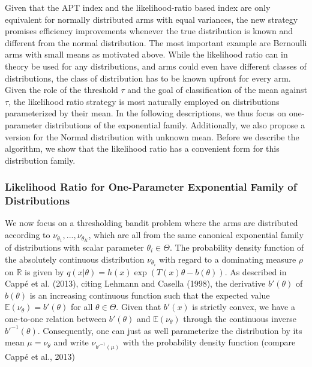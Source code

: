 \documentclass[11pt,]{article}
\begin{document}
Given that the APT index and the likelihood-ratio based index are only
equivalent for normally distributed arms with equal variances, the new
strategy promises efficiency improvements whenever the true distribution
is known and different from the normal distribution. The most important
example are Bernoulli arms with small means as motivated above. While
the likelihood ratio can in theory be used for any distributions, and
arms could even have different classes of distributions, the class of
distribution has to be known upfront for every arm. Given the role of
the threshold \(\tau\) and the goal of classification of the mean
against \(\tau\), the likelihood ratio strategy is most naturally
employed on distributions parameterized by their mean. In the following
descriptions, we thus focus on one-parameter distributions of the
exponential family. Additionally, we also propose a version for the
Normal distribution with unknown mean. Before we describe the algorithm,
we show that the likelihood ratio has a convenient form for this
distribution family.

\subsubsection{\texorpdfstring{Likelihood Ratio for One-Parameter
Exponential Family of Distributions
\label{sec:LRforUnivariateExponentialFamily}}{Likelihood Ratio for One-Parameter Exponential Family of Distributions }}\label{likelihood-ratio-for-one-parameter-exponential-family-of-distributions}

We now focus on a thresholding bandit problem where the arms are
distributed according to \(\nu_{\theta_1}, ..., \nu_{\theta_K}\), which
are all from the same canonical exponential family of distributions with
scalar parameter \(\theta_i \in \Theta\). The probability density
function of the absolutely continuous distribution \(\nu_{\theta_i}\)
with regard to a dominating measure \(\rho\) on \(\mathbb{R}\) is given
by \(q(x|\theta) = h(x) \exp(T(x)\theta - b(\theta))\). As described in
Cappé et al. (2013), citing Lehmann and Casella (1998), the derivative
\(b'(\theta)\) of \(b(\theta)\) is an increasing continuous function
such that the expected value \(\mathbb{E}(\nu_{\theta}) = b'(\theta)\)
for all \(\theta \in \Theta\). Given that \(b'(x)\) is strictly convex,
we have a one-to-one relation between \(b'(\theta)\) and
\(\mathbb{E}(\nu_{\theta})\) through the continuous inverse
\(b'^{-1}(\theta)\). Consequently, one can just as well parameterize the
distribution by its mean \(\mu = \mathbb{\nu_{\theta}}\) and write
\(\nu_{b'^{-1}(\mu)}\) with the probability density function (compare
Cappé et al., 2013)
\end{document}
